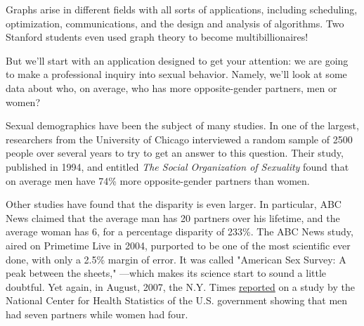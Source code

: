 %
%
%
%
%

\label{simple_graphs_chap}

Graphs arise in different fields with all sorts of applications,
including scheduling, optimization, communications, and the design and
analysis of algorithms.  Two Stanford students even used graph theory to
become multibillionaires!

But we'll start with an application designed to get your attention: we are
going to make a professional inquiry into sexual behavior.  Namely, we'll
look at some data about who, on average, who has more opposite-gender
partners, men or women?

Sexual demographics have been the subject of many studies.  In one of the
largest, researchers from the University of Chicago interviewed a random
sample of 2500 people over several years to try to get an answer to this
question.  Their study, published in 1994, and entitled \emph{The Social
  Organization of Sexuality} found that on average men have 74\% more
opposite-gender partners than women.

Other studies have found that the disparity is even larger.  In
particular, ABC News claimed that the average man has 20 partners over his
lifetime, and the average woman has 6, for a percentage disparity of
233\%.  The ABC News study, aired on Primetime Live in 2004, purported to
be one of the most scientific ever done, with only a 2.5\% margin of
error.  It was called "American Sex Survey: A peak between the sheets,"
---which makes its science start to sound a little doubtful.  
Yet again, in August, 2007, the N.Y. Times
\href{http://www.nytimes.com/2007/08/12/weekinreview/12kolata.html?_r=1&n=Top/Reference/Times%20Topics/People/K/Kolata,%20Gina&oref=slogin}{reported} on a study by the
  National Center for Health Statistics of the U.S. government showing
  that men had seven partners while women had four.

